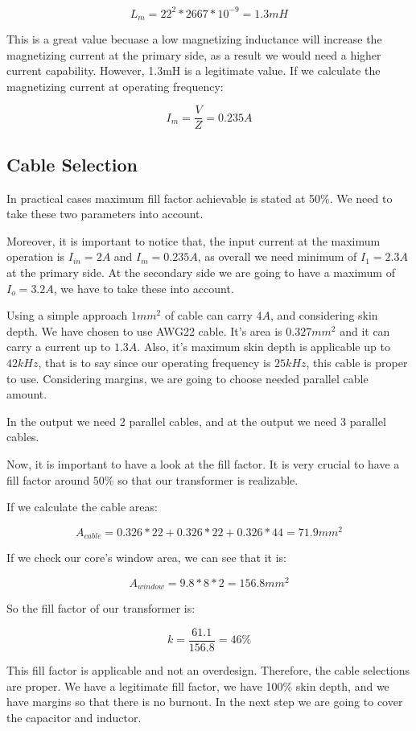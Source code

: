 $$ L_m = 22^2 * 2667 * 10^{-9} = 1.3 mH$$

This is a great value becuase a low magnetizing inductance will increase the magnetizing current at the primary side, as a result we would need a higher current capability. However, 1.3mH is a legitimate value. If we calculate the magnetizing current at operating frequency:

$$ I_m = \dfrac{V}{Z} = 0.235 A $$


\subsection{Cable Selection}


In practical cases maximum fill factor achievable is stated at 50\%. We need to take these two parameters into account.

Moreover, it is important to notice that, the input current at the maximum operation is $I_{in} = 2A$ and $I_m = 0.235A$, as overall we need minimum of $I_1 = 2.3A$ at the primary side. At the secondary side we are going to have a maximum of $I_o = 3.2A$, we have to take these into account. 

Using a simple approach $1 mm^2$ of cable can carry $4A$, and considering skin depth. We have chosen to use AWG22 cable. It's area is $0.327 mm^2$ and it can carry a current up to $1.3A$. Also, it's maximum skin depth is applicable up to $42kHz$, that is to say since our operating frequency is $25kHz$, this cable is proper to use. Considering margins, we are going to choose needed parallel cable amount.

In the output we need 2 parallel cables, and at the output we need 3 parallel cables.

Now, it is important to have a look at the fill factor. It is very crucial to have a fill factor around $50\%$ so that our transformer is realizable. 

If we calculate the cable areas:

$$A_{cable} = 0.326*22 + 0.326*22 + 0.326*44 = 71.9 mm^2$$

If we check our core's window area, we can see that it is:

$$A_{window} = 9.8*8*2 = 156.8 mm^2 $$

So the fill factor of our transformer is:

$$k = \dfrac{61.1}{156.8} = 46\%$$

This fill factor is applicable and not an overdesign. Therefore, the cable selections are proper. We have a legitimate fill factor, we have 100\% skin depth, and we have margins so that there is no burnout. In the next step we are going to cover the capacitor and inductor.


